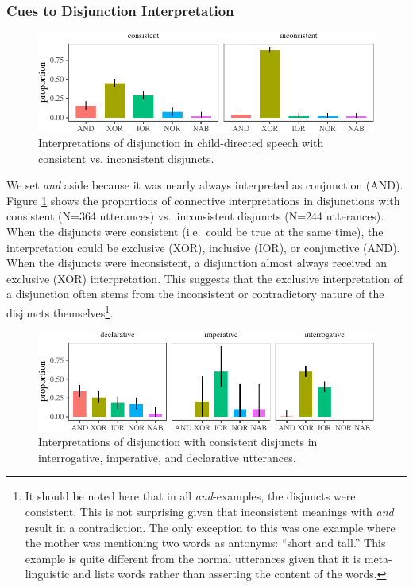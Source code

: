 \documentclass[
  english,
  ,man,floatsintext]{apa6}
\begin{document}
\hypertarget{cues-to-disjunction-interpretation}{%
\subsubsection{Cues to Disjunction Interpretation}\label{cues-to-disjunction-interpretation}}

\begin{figure}[H]

{\centering \includegraphics{figs/consistencyPlot-1} 

}

\caption{Interpretations of disjunction in child-directed speech with consistent vs. inconsistent disjuncts.}\label{fig:consistencyPlot}
\end{figure}

We set \emph{and} aside because it was nearly always interpreted as conjunction (AND). Figure \ref{fig:consistencyPlot} shows the proportions of connective interpretations in disjunctions with consistent (N=364 utterances) vs.~inconsistent disjuncts (N=244 utterances). When the disjuncts were consistent (i.e.~could be true at the same time), the interpretation could be exclusive (XOR), inclusive (IOR), or conjunctive (AND). When the disjuncts were inconsistent, a disjunction almost always received an exclusive (XOR) interpretation. This suggests that the exclusive interpretation of a disjunction often stems from the inconsistent or contradictory nature of the disjuncts themselves\footnote{It should be noted here that in all \emph{and}-examples, the disjuncts were consistent. This is not surprising given that inconsistent meanings with \emph{and} result in a contradiction. The only exception to this was one example where the mother was mentioning two words as antonyms: ``short and tall.'' This example is quite different from the normal utterances given that it is meta-linguistic and lists words rather than asserting the content of the words.}.

\begin{figure}[H]

{\centering \includegraphics{figs/utterancePlot-1} 

}

\caption{Interpretations of disjunction with consistent disjuncts in interrogative, imperative, and declarative utterances.}\label{fig:utterancePlot}
\end{figure}
\end{document}
